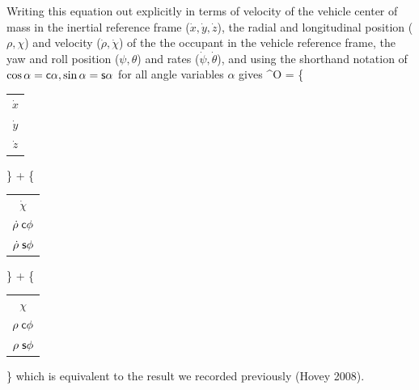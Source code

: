 \documentclass[10pt,legalpaper,twocolumn,reqno]{amsart}
\begin{document}
Writing this equation out explicitly in terms of velocity of the vehicle center
of mass in the inertial reference frame ($\dot{x}, \dot{y}, \dot{z}$), 
the radial and longitudinal position ($\rho, \chi$) and velocity 
($\dot{\rho}, \dot{\chi}$)
of the the occupant in the vehicle reference frame,
the yaw and roll position ($\psi, \theta$) and rates ($\dot{\psi}, \dot{\theta}$), 
and using the shorthand notation of 
$\cos \alpha = \sf c \alpha, \sin \alpha = \sf s \alpha$ 
for all angle variables $\alpha$ gives
\be
{}\vv^{O} 
= 
\left\{  
	\begin{tabular}{c}
 	  	$\dot{x}$ \\ 
 		$\dot{y}$ \\ 
 		$\dot{z}$
 	\end{tabular}
\right\}
+
\left\{  
	\begin{tabular}{c}
 	  	$\dot{\chi}$ \\ 
 		$\dot{\rho} \; \hcos \phi$ \\ 
 		$\dot{\rho} \; \hsin \phi$
 	\end{tabular}
\right\}
+
\nonumber
\ee
\be
{}
\left\{  
	\begin{tabular}{c}
 	  	$\chi$ \\ 
 		$\rho \; \hcos \phi$ \\ 
 		$\rho \; \hsin \phi$
 	\end{tabular}
\right\}
\label{eq:velocityExpanded}
\ee
which is equivalent to the result we recorded previously (Hovey 2008).
\end{document}
